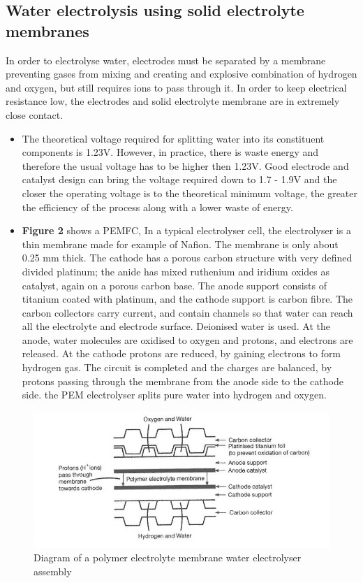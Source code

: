 \documentclass{article}
\begin{document}
    \subsection{Water electrolysis using solid electrolyte membranes}
    In order to electrolyse water, electrodes must be separated by a membrane preventing gases from mixing 
    and creating and explosive combination of hydrogen and oxygen, but still requires ions to pass through it. 
    In order to keep electrical resistance low, the electrodes and solid electrolyte membrane are in extremely close contact. 
    \newline
    \begin{itemize}
        \item The theoretical voltage required for splitting water into its constituent components is 1.23V. 
        However, in practice, there is waste energy and therefore the usual voltage has to be higher then 1.23V. 
        Good electrode and catalyst design can bring the voltage required down to 1.7 - 1.9V and the closer the operating 
        voltage is to the theoretical minimum voltage, the greater the efficiency of the process along with a lower waste of energy.
        \item \textbf{Figure 2} shows a PEMFC, In a typical electrolyser cell, the electrolyser is a thin membrane made for example of Nafion. 
        The membrane is only about 0.25 mm thick. The cathode has a porous carbon structure with very defined 
        divided platinum; the anide has mixed ruthenium and iridium oxides as catalyst, again on a porous carbon base. 
        The anode support consists of titanium coated with platinum, and the cathode support is carbon fibre. The carbon collectors 
        carry current, and contain channels so that water can reach all the electrolyte and electrode surface.
        \newline Deionised water is used. At the anode, water molecules are oxidised to oxygen and protons, and electrons are released. 
        At the cathode protons are reduced, by gaining electrons to form hydrogen gas. The circuit is completed and the charges are balanced, 
        by protons passing through the membrane from the anode side to the cathode side.
        \newline the PEM electrolyser splits pure water into hydrogen and oxygen.
    \end{itemize}
    \begin{figure}
        \centering
        \includegraphics[scale=0.4]{./electro.png}
        \caption{Diagram of a polymer electrolyte membrane water electrolyser assembly \cite{ETH}}
    \end{figure}
\end{document}
